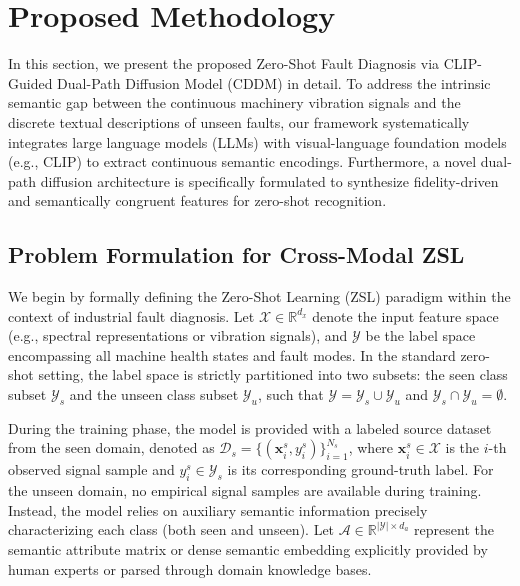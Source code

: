 \section{Proposed Methodology}
\label{sec:methodology}

In this section, we present the proposed Zero-Shot Fault Diagnosis via CLIP-Guided Dual-Path Diffusion Model (CDDM) in detail. To address the intrinsic semantic gap between the continuous machinery vibration signals and the discrete textual descriptions of unseen faults, our framework systematically integrates large language models (LLMs) with visual-language foundation models (e.g., CLIP) to extract continuous semantic encodings. Furthermore, a novel dual-path diffusion architecture is specifically formulated to synthesize fidelity-driven and semantically congruent features for zero-shot recognition. 

\subsection{Problem Formulation for Cross-Modal ZSL}
\label{subsec:problem_formulation}

We begin by formally defining the Zero-Shot Learning (ZSL) paradigm within the context of industrial fault diagnosis. Let $\mathcal{X} \in \mathbb{R}^{d_x}$ denote the input feature space (e.g., spectral \cite{smith2011scientist} representations or vibration signals), and $\mathcal{Y}$ be the label space encompassing all machine health states and fault modes. In the standard zero-shot setting, the label space is strictly partitioned into two subsets: the seen class subset $\mathcal{Y}_s$ and the unseen class subset $\mathcal{Y}_u$, such that $\mathcal{Y} = \mathcal{Y}_s \cup \mathcal{Y}_u$ and $\mathcal{Y}_s \cap \mathcal{Y}_u = \emptyset$.

During the training phase, the model is provided with a labeled source dataset from the seen domain, denoted as $\mathcal{D}_s = \{(\mathbf{x}_i^s, y_i^s)\}_{i=1}^{N_s}$, where $\mathbf{x}_i^s \in \mathcal{X}$ is the $i$-th observed signal sample and $y_i^s \in \mathcal{Y}_s$ is its corresponding ground-truth label. For the unseen domain, no empirical signal samples are available during training. Instead, the model relies on auxiliary semantic information precisely characterizing each class (both seen and unseen). Let $\mathcal{A} \in \mathbb{R}^{|\mathcal{Y}| \times d_a}$ represent the semantic attribute matrix or dense semantic embedding \cite{mikolov2013efficient} explicitly provided by human experts or parsed through domain knowledge bases. 

